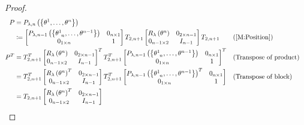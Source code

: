 \documentclass[../main.tex]{subfiles}
\begin{document}
\begin{proof}
\begin{align*}
P
&=P_{\lambda,n}\left(\left\{\tensor{\theta}{^1},\dots,\tensor{\theta}{^n}\right\}\right)\\
&\coloneqq
\begin{bmatrix}
P_{\lambda,n-1}\left(\left\{\tensor{\theta}{^1_{n}},\dots,\tensor{\theta}{^{n-1}}\right\}\right)&0_{n\times 1}\\
0_{1\times n}&1\\
\end{bmatrix}
T_{2,n+1}
\begin{bmatrix}
R_\lambda\left(\tensor{\theta}{^n}\right)&0_{{2}\times{n-1}}\\
0_{{n-1}\times{2}}&{I}_{n-1}\\
\end{bmatrix}
T_{2,n+1}&&\text{(\cref{M:Position})}\\
P^T
&=
T_{2,n+1}^T
\begin{bmatrix}
R_\lambda\left(\tensor{\theta}{^n}\right)&0_{{2}\times{n-1}}\\
0_{{n-1}\times{2}}&{I}_{n-1}\\
\end{bmatrix}^T
T_{2,n+1}^T
\begin{bmatrix}
P_{\lambda,n-1}\left(\left\{\tensor{\theta}{^1_{n}},\dots,\tensor{\theta}{^{n-1}}\right\}\right)&0_{n\times 1}\\
0_{1\times n}&1\\
\end{bmatrix}^T&&\text{(Transpose of product)}\\
&=
T_{2,n+1}^T
\begin{bmatrix}
R_\lambda\left(\tensor{\theta}{^n}\right)^T&0_{{2}\times{n-1}}\\
0_{{n-1}\times{2}}&{I}_{n-1}\\
\end{bmatrix}
T_{2,n+1}^T
\begin{bmatrix}
P_{\lambda,n-1}\left(\left\{\tensor{\theta}{^1_{n}},\dots,\tensor{\theta}{^{n-1}}\right\}\right)^T&0_{n\times 1}\\
0_{1\times n}&1\\
\end{bmatrix}
&&\text{(Transpose of block)}\\
&=
T_{2,n+1}
\begin{bmatrix}
R_\lambda\left(\tensor{\theta}{^n}\right)^T&0_{{2}\times{n-1}}\\
0_{{n-1}\times{2}}&{I}_{n-1}\\

\end{bmatrix}
\end{align*}
\end{proof}
\end{document}
